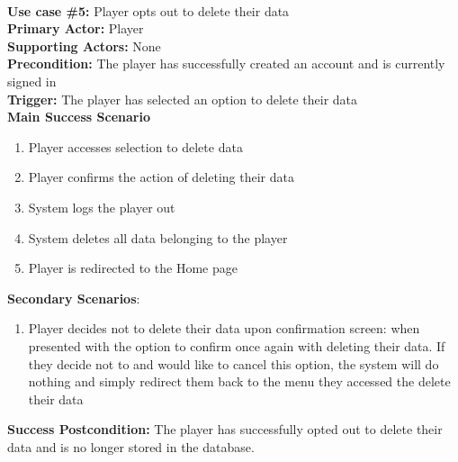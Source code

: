 \documentclass{article}
\begin{document}
\noindent\\
\textbf{Use case \#5:} Player opts out to delete their data\\
\textbf{Primary Actor:} Player\\
\textbf{Supporting Actors:} None\\
\textbf{Precondition:} The player has successfully created an account and is currently signed in\\
\textbf{Trigger:} The player has selected an option to delete their data\\
\textbf{Main Success Scenario}
\begin{enumerate}
    \item Player accesses selection to delete data
    \item Player confirms the action of deleting their data
    \item System logs the player out
    \item System deletes all data belonging to the player
    \item Player is redirected to the Home page
\end{enumerate}
\textbf{Secondary Scenarios}:
\begin{enumerate}
    \item Player decides not to delete their data upon confirmation screen: when presented with the option to confirm once again with deleting their data. If they decide not to and would like to cancel this option, the system will do nothing and simply redirect them back to the menu they accessed the delete their data
\end{enumerate}
\textbf{Success Postcondition:} The player has successfully opted out to delete their data and is no longer stored in the database. \newline
\end{document}
